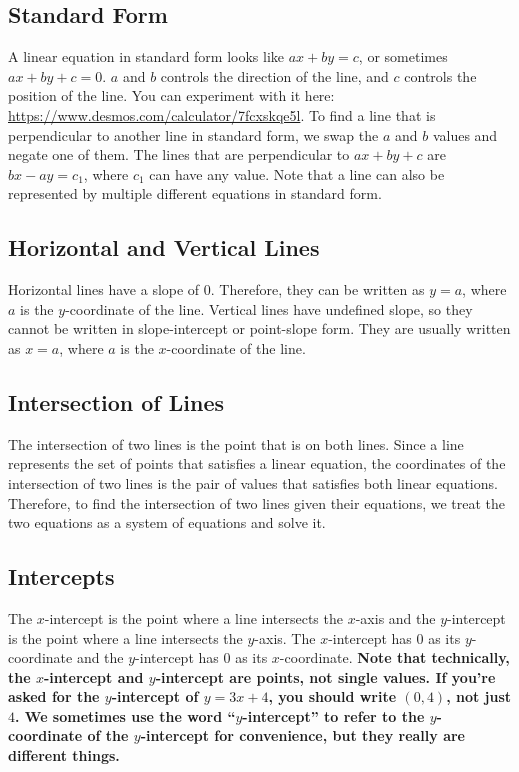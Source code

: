 \documentclass{article}
\begin{document}
    \subsection*{Standard Form}
    A linear equation in standard form looks like $ax + by = c$, or sometimes
    $ax + by + c = 0$. $a$ and $b$ controls the direction of the line, and $c$
    controls the position of the line. You can experiment with it here:
    \url{https://www.desmos.com/calculator/7fcxskqe5l}. To find a line that is
    perpendicular to another line in standard form, we swap the $a$ and $b$
    values and negate one of them. The lines that are perpendicular to $ax + by
    + c$ are $bx - ay = c_1$, where $c_1$ can have any value. Note that a line
    can also be represented by multiple different equations in standard form.
    \subsection*{Horizontal and Vertical Lines}
    Horizontal lines have a slope of $0$. Therefore, they can be written as $y =
    a$, where $a$ is the $y$-coordinate of the line. Vertical lines have
    undefined slope, so they cannot be written in slope-intercept or point-slope
    form. They are usually written as $x = a$, where $a$ is the $x$-coordinate
    of the line.
    \subsection*{Intersection of Lines}
    The intersection of two lines is the point that is on both lines. Since a
    line represents the set of points that satisfies a linear equation, the
    coordinates of the intersection of two lines is the pair of values that
    satisfies both linear equations. Therefore, to find the intersection of two
    lines given their equations, we treat the two equations as a system of
    equations and solve it.
    \subsection*{Intercepts}
    The $x$-intercept is the point where a line intersects the $x$-axis and the
    $y$-intercept is the point where a line intersects the $y$-axis. The
    $x$-intercept has $0$ as its $y$-coordinate and the $y$-intercept has $0$ as
    its $x$-coordinate. \textbf{Note that technically, the $x$-intercept and
    $y$-intercept are points, not single values. If you're asked for the
    $y$-intercept of $y = 3x + 4$, you should write $(0, 4)$, not just $4$. We
    sometimes use the word ``$y$-intercept'' to refer to the $y$-coordinate of
    the $y$-intercept for convenience, but they really are different things.}
\end{document}
